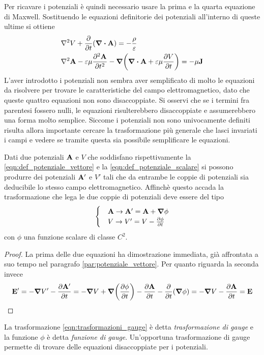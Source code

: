 Per ricavare i potenziali è quindi necessario usare la prima e la quarta equazione di Maxwell. Sostituendo le equazioni
definitorie dei potenziali all'interno di queste ultime si ottiene
\[
    \begin{split}
        &\laplacian{V}+\pdv{t}(\div{\vb{A}})=-\frac{\rho}{\epsilon}\\
        &\laplacian{\vb{A}}-\epsilon\mu \pdv[2]{\vb{A}}{t}-\grad(\div{\vb{A}}+\epsilon\mu\pdv{V}{t})=-\mu\vb{J}
    \end{split}
\]
L'aver introdotto i potenziali non sembra aver semplificato di molto le equazioni da risolvere per trovare le caratteristiche del campo
elettromagnetico, dato che queste quattro equazioni non sono disaccoppiate. Si osservi che se i termini fra parentesi fossero
nulli, le equazioni risulterebbero disaccoppiate e assumerebbero una forma molto semplice.
Siccome i potenziali non sono univocamente definiti risulta allora
importante cercare la trasformazione più generale che lasci invariati i campi e vedere se tramite questa sia possibile
semplificare le equazioni.
\begin{thm}
    Dati due potenziali $\vb{A}$ e $V$ che soddisfano rispettivamente la \eqref{eqn:def_potenziale_vettore} e la
    \eqref{eqn:def_potenziale_scalare} si possono produrre dei potenziali $\vb{A}'$ e $V'$ tali che da entrambe le coppie di potenziali
    sia deducibile lo stesso campo elettromagnetico. Affinchè questo accada la trasformazione che lega le due coppie di potenziali deve
    essere del tipo
    \begin{equation}
        \label{eqn:trasformazioni_gauge}
        \begin{cases}
            & \vb{A}\to \vb{A}'=\vb{A}+\grad{\phi}\\
            & V\to V'=V-\pdv{\phi}{t}
        \end{cases}
    \end{equation}
    con $\phi$ una funzione scalare di classe $C^2$.
\end{thm}
\begin{proof}
    La prima delle due equazioni ha dimostrazione immediata, già affrontata a suo tempo nel paragrafo \ref{par:potenziale_vettore}.
    Per quanto riguarda la seconda invece
    \[
        \vb{E}'=-\grad{V'}-\pdv{\vb{A}'}{t}=-\grad{V}+\grad(\pdv{\phi}{t})-\pdv{\vb{A}}{t}-\pdv{t}(\grad{\phi})=-\grad{V}-\pdv{\vb{A}}{t}=\vb{E}
    \]
\end{proof}
La trasformazione \eqref{eqn:trasformazioni_gauge} è detta \textit{trasformazione di gauge} e la funzione $\phi$ è
detta \textit{funzione di gauge}. Un'opportuna trasformazione di gauge permette di trovare delle equazioni disaccoppiate
per i potenziali.

